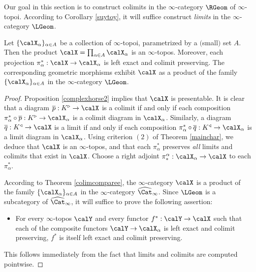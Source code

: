 Our goal in this section is to construct colimits in the $\infty$-category $\RGeom$ of $\infty$-topoi. 
According to Corollary \ref{suytoy}, it will suffice construct {\em limits} in the $\infty$-category $\LGeom$. 

\begin{proposition}\label{quathorse}
Let $\{ \calX_{\alpha} \}_{\alpha \in A}$ be a collection of $\infty$-topoi, parametrized by a $($small$)$
set $A$. Then the product $\calX = \prod_{\alpha \in A} \calX_{\alpha}$ is an $\infty$-topos.
Moreover, each projection $\pi^{\ast}_{\alpha}: \calX \rightarrow \calX_{\alpha}$ is left exact and colimit preserving. The corresponding geometric morphisms exhibit $\calX$ as a product of the family $\{ \calX_{\alpha} \}_{\alpha \in A}$ in the $\infty$-category $\LGeom$.
\end{proposition}

\begin{proof}
Proposition \ref{complexhorse2} implies that $\calX$ is presentable.
It is clear that a diagram $\overline{p}: K^{\triangleright} \rightarrow \calX$ is a colimit if and only if each composition
$\pi^{\ast}_{\alpha} \circ \overline{p}: K^{\triangleright} \rightarrow \calX_{\alpha}$
is a colimit diagram in $\calX_{\alpha}$. 
Similarly, a diagram $\overline{q}: K^{\triangleleft} \rightarrow \calX$ is a limit if and only if each composition
$\pi^{\ast}_{\alpha} \circ \overline{q}: K^{\triangleleft} \rightarrow \calX_{\alpha}$
is a limit diagram in $\calX_{\alpha}$. Using criterion $(2)$ of Theorem \ref{mainchar}, we deduce that $\calX$ is an $\infty$-topos, and that each $\pi^{\ast}_{\alpha}$ preserves {\em all} limits and colimits that exist in $\calX$. Choose a right adjoint
$\pi_{\ast}^{\alpha}: \calX_{\alpha} \rightarrow \calX$ to each $\pi^{\ast}_{\alpha}$. 

According to Theorem \ref{colimcomparee}, the $\infty$-category $\calX$ is a product
of the family $\{ \calX_{\alpha} \}_{\alpha \in A}$ in the $\infty$-category $\widehat{\Cat}_{\infty}$. Since $\LGeom$ is a subcategory of $\widehat{\Cat}_{\infty}$, it will suffice to prove the following assertion:

\begin{itemize}
\item For every $\infty$-topos $\calY$ and every functor $f^{\ast}: \calY \rightarrow \calX$
such that each of the composite functors $\calY \rightarrow \calX_{\alpha}$ is left exact and colimit preserving, $f^{\ast}$ is itself left exact and colimit preserving.
\end{itemize}

This follows immediately from the fact that limits and colimits are computed pointwise.
\end{proof}

